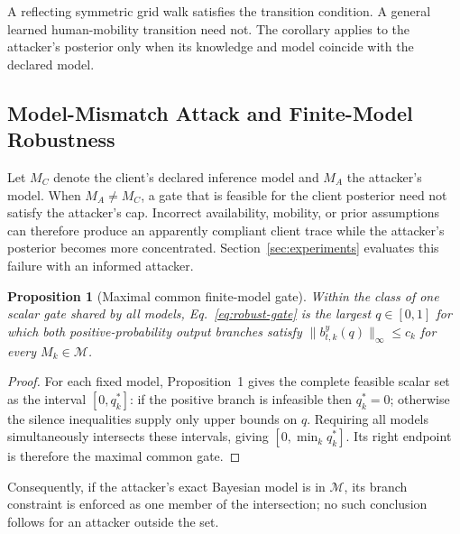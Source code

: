 \documentclass[10pt,journal,compsoc]{IEEEtran}
\newtheorem{proposition}{Proposition}
\begin{document}
A reflecting symmetric grid walk satisfies the transition condition. A general learned human-mobility transition need not. The corollary applies to the attacker's posterior only when its knowledge and model coincide with the declared model.

\subsection{Model-Mismatch Attack and Finite-Model Robustness}
Let $M_C$ denote the client's declared inference model and $M_A$ the attacker's model. When $M_A\neq M_C$, a gate that is feasible for the client posterior need not satisfy the attacker's cap. Incorrect availability, mobility, or prior assumptions can therefore produce an apparently compliant client trace while the attacker's posterior becomes more concentrated. Section~\ref{sec:experiments} evaluates this failure with an informed attacker.

\begin{proposition}[Maximal common finite-model gate]
Within the class of one scalar gate shared by all models, Eq.~\eqref{eq:robust-gate} is the largest $q\in[0,1]$ for which both positive-probability output branches satisfy $\|b_{t,k}^{y}(q)\|_\infty\le c_k$ for every $M_k\in\mathcal M$.
\end{proposition}
\begin{proof}
For each fixed model, Proposition~1 gives the complete feasible scalar set as the interval $[0,q_k^*]$: if the positive branch is infeasible then $q_k^*=0$; otherwise the silence inequalities supply only upper bounds on $q$. Requiring all models simultaneously intersects these intervals, giving $[0,\min_k q_k^*]$. Its right endpoint is therefore the maximal common gate.
\end{proof}

Consequently, if the attacker's exact Bayesian model is in $\mathcal M$, its branch constraint is enforced as one member of the intersection; no such conclusion follows for an attacker outside the set.
\end{document}
